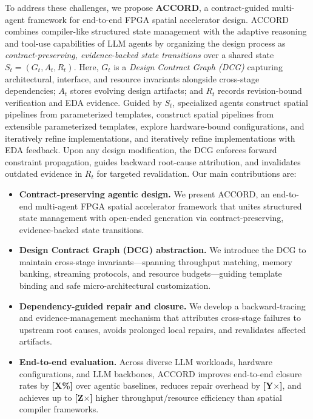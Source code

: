 \documentclass[conference]{IEEEtran}
\begin{document}
To address these challenges, we propose \textbf{ACCORD}, a contract-guided multi-agent framework for end-to-end FPGA spatial accelerator design. ACCORD combines compiler-like structured state management with the adaptive reasoning and tool-use capabilities of LLM agents by organizing the design process as \emph{contract-preserving, evidence-backed state transitions} over a shared state $S_t=(G_t,A_t,R_t)$. Here, $G_t$ is a \emph{Design Contract Graph (DCG)} capturing architectural, interface, and resource invariants alongside cross-stage dependencies; $A_t$ stores evolving design artifacts; and $R_t$ records revision-bound verification and EDA evidence. Guided by $S_t$, specialized agents construct spatial pipelines from parameterized templates, construct spatial pipelines from extensible parameterized templates, explore hardware-bound configurations, and iteratively refine implementations, and iteratively refine implementations with EDA feedback. Upon any design modification, the DCG enforces forward constraint propagation, guides backward root-cause attribution, and invalidates outdated evidence in $R_t$ for targeted revalidation. Our main contributions are:
\begin{itemize}
\item \textbf{Contract-preserving agentic design.} We present ACCORD, an end-to-end multi-agent FPGA spatial accelerator framework that unites structured state management with open-ended generation via contract-preserving, evidence-backed state transitions.
\item \textbf{Design Contract Graph (DCG) abstraction.} We introduce the DCG to maintain cross-stage invariants—spanning throughput matching, memory banking, streaming protocols, and resource budgets—guiding template binding and safe micro-architectural customization.
\item \textbf{Dependency-guided repair and closure.} We develop a backward-tracing and evidence-management mechanism that attributes cross-stage failures to upstream root causes, avoids prolonged local repairs, and revalidates affected artifacts.
\item \textbf{End-to-end evaluation.} Across diverse LLM workloads, hardware configurations, and LLM backbones, ACCORD improves end-to-end closure rates by \textbf{[X\%]} over agentic baselines, reduces repair overhead by \textbf{[Y$\times$]}, and achieves up to \textbf{[Z$\times$]} higher throughput/resource efficiency than spatial compiler frameworks.
\end{itemize}
\end{document}
